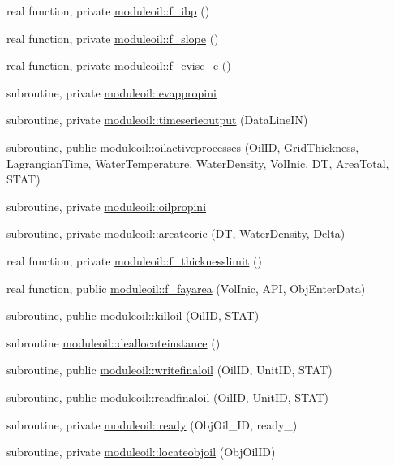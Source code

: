\begin{DoxyCompactItemize}
real function, private \mbox{\hyperlink{namespacemoduleoil_ad53f4584cf329af849a4ee69c63351c9}{moduleoil\+::f\+\_\+ibp}} ()
\item 
real function, private \mbox{\hyperlink{namespacemoduleoil_adabc2068ec1e8096747e483ba890f006}{moduleoil\+::f\+\_\+slope}} ()
\item 
real function, private \mbox{\hyperlink{namespacemoduleoil_a554da2e0cba3e570da78338d2aeef85a}{moduleoil\+::f\+\_\+cvisc\+\_\+e}} ()
\item 
subroutine, private \mbox{\hyperlink{namespacemoduleoil_accb31df9c42356be9b53b31d0d888b3b}{moduleoil\+::evappropini}}
\item 
subroutine, private \mbox{\hyperlink{namespacemoduleoil_ac0b9f29833f831cd80144ac91359798f}{moduleoil\+::timeserieoutput}} (Data\+Line\+IN)
\item 
subroutine, public \mbox{\hyperlink{namespacemoduleoil_aa53749d5416d21d1602ffd0208f0f8f2}{moduleoil\+::oilactiveprocesses}} (Oil\+ID, Grid\+Thickness, Lagrangian\+Time, Water\+Temperature, Water\+Density, Vol\+Inic, DT, Area\+Total, S\+T\+AT)
\item 
subroutine, private \mbox{\hyperlink{namespacemoduleoil_a11e04f321f0ebc3e9a379f908b8a0cd2}{moduleoil\+::oilpropini}}
\item 
subroutine, private \mbox{\hyperlink{namespacemoduleoil_aeef3927895fe2023671f25edeb829a30}{moduleoil\+::areateoric}} (DT, Water\+Density, Delta)
\item 
real function, private \mbox{\hyperlink{namespacemoduleoil_a1e48ccf914b9fc3382e9fb87517e6a8d}{moduleoil\+::f\+\_\+thicknesslimit}} ()
\item 
real function, public \mbox{\hyperlink{namespacemoduleoil_aae34355db8babcba835b1b3af18baa95}{moduleoil\+::f\+\_\+fayarea}} (Vol\+Inic, A\+PI, Obj\+Enter\+Data)
\item 
subroutine, public \mbox{\hyperlink{namespacemoduleoil_a3515505fcda962cedd51dd5986ff6777}{moduleoil\+::killoil}} (Oil\+ID, S\+T\+AT)
\item 
subroutine \mbox{\hyperlink{namespacemoduleoil_ae94c3b6ecc29b85e8ccbddf231f67646}{moduleoil\+::deallocateinstance}} ()
\item 
subroutine, public \mbox{\hyperlink{namespacemoduleoil_afaa341d33088f674ca74e6ac763daa2d}{moduleoil\+::writefinaloil}} (Oil\+ID, Unit\+ID, S\+T\+AT)
\item 
subroutine, public \mbox{\hyperlink{namespacemoduleoil_aaa3a2256f78ae25e941bfe7a937c796b}{moduleoil\+::readfinaloil}} (Oil\+ID, Unit\+ID, S\+T\+AT)
\item 
subroutine, private \mbox{\hyperlink{namespacemoduleoil_a16763a360a31b49d4f67bbba295472a5}{moduleoil\+::ready}} (Obj\+Oil\+\_\+\+ID, ready\+\_\+)
\item 
subroutine, private \mbox{\hyperlink{namespacemoduleoil_aa0854458437dd99f9ef2103ed4f048b4}{moduleoil\+::locateobjoil}} (Obj\+Oil\+ID)
\end{DoxyCompactItemize}
